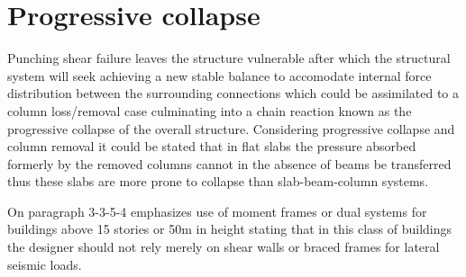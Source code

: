 \section{Progressive collapse}
Punching shear failure leaves the structure vulnerable after which the structural system will seek achieving a new stable balance to accomodate internal force distribution between the surrounding connections which could be assimilated to a column loss/removal case culminating into a chain reaction known as the progressive collapse of the overall structure\citep{zhao2015,king2004,PARK2012119}.
Considering progressive collapse and column removal it could be stated that in flat slabs the pressure absorbed formerly by the removed columns cannot in the absence of beams be transferred thus these slabs are more prone to collapse than slab-beam-column systems\citep{Singh2023}. 

 On paragraph 3-3-5-4 \citep{28002014} %
 emphasizes use of moment frames or dual systems for buildings above 15 stories or 50m in height stating that in this class of buildings the designer should not rely merely on shear walls or braced frames for lateral seismic loads.